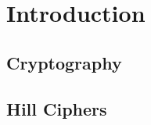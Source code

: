 \section{Introduction} %
\label{sec:introduction}

\subsection{Cryptography} %
\label{sub:cryptography}


\subsection{Hill Ciphers} %
\label{sub:hill_ciphers}




